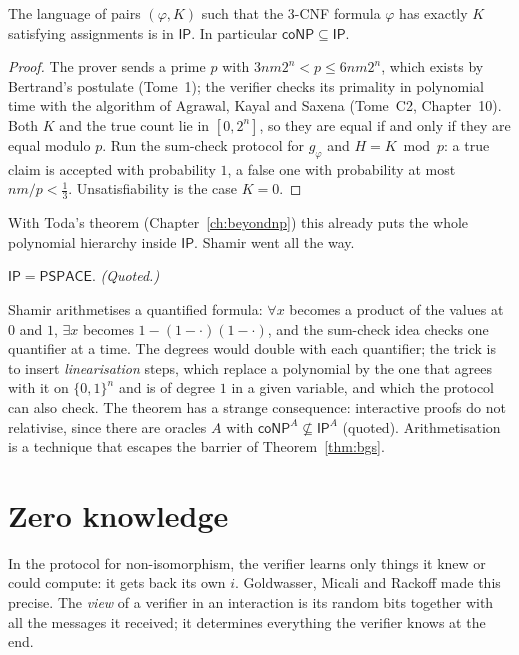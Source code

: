 \begin{corollary}\label{cor:sharpsatip}
The language of pairs $(\varphi,K)$ such that the 3-CNF formula $\varphi$ has exactly $K$ satisfying assignments is in $\mathsf{IP}$. In particular $\mathsf{coNP}\subseteq\mathsf{IP}$.
\end{corollary}

\begin{proof}
The prover sends a prime $p$ with $3nm2^n<p\le6nm2^n$, which exists by Bertrand's postulate (Tome~1); the verifier checks its primality in polynomial time with the algorithm of Agrawal, Kayal and Saxena (Tome~C2, Chapter~10). Both $K$ and the true count lie in $[0,2^n]$, so they are equal if and only if they are equal modulo $p$. Run the sum-check protocol for $g_\varphi$ and $H=K\bmod p$: a true claim is accepted with probability $1$, a false one with probability at most $nm/p<\frac13$. Unsatisfiability is the case $K=0$.
\end{proof}

With Toda's theorem (Chapter~\ref{ch:beyondnp}) this already puts the whole polynomial hierarchy inside $\mathsf{IP}$. Shamir went all the way.

\begin{theorem}[Shamir 1990]\label{thm:shamir}
$\mathsf{IP}=\mathsf{PSPACE}$. \emph{(Quoted.)}
\end{theorem}

Shamir arithmetises a quantified formula: $\forall x$ becomes a product of the values at $0$ and $1$, $\exists x$ becomes $1-(1-\cdot)(1-\cdot)$, and the sum-check idea checks one quantifier at a time. The degrees would double with each quantifier; the trick is to insert \emph{linearisation} steps, which replace a polynomial by the one that agrees with it on $\{0,1\}^n$ and is of degree $1$ in a given variable, and which the protocol can also check. The theorem has a strange consequence: interactive proofs do not relativise, since there are oracles $A$ with $\mathsf{coNP}^A\not\subseteq\mathsf{IP}^A$ (quoted). Arithmetisation is a technique that escapes the barrier of Theorem~\ref{thm:bgs}.

\section{Zero knowledge}\label{sec:zk}

In the protocol for non-isomorphism, the verifier learns only things it knew or could compute: it gets back its own $i$. Goldwasser, Micali and Rackoff made this precise. The \emph{view} of a verifier in an interaction is its random bits together with all the messages it received; it determines everything the verifier knows at the end.

